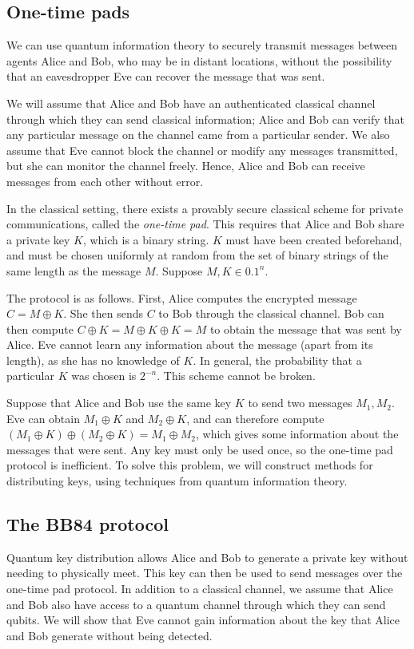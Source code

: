 \subsection{One-time pads}
We can use quantum information theory to securely transmit messages between agents Alice and Bob, who may be in distant locations, without the possibility that an eavesdropper Eve can recover the message that was sent.

We will assume that Alice and Bob have an authenticated classical channel through which they can send classical information; Alice and Bob can verify that any particular message on the channel came from a particular sender.
We also assume that Eve cannot block the channel or modify any messages transmitted, but she can monitor the channel freely.
Hence, Alice and Bob can receive messages from each other without error.

In the classical setting, there exists a provably secure classical scheme for private communications, called the \emph{one-time pad}.
This requires that Alice and Bob share a private key \( K \), which is a binary string.
\( K \) must have been created beforehand, and must be chosen uniformly at random from the set of binary strings of the same length as the message \( M \).
Suppose \( M, K \in \qty{0,1}^n \).

The protocol is as follows.
First, Alice computes the encrypted message \( C = M \oplus K \).
She then sends \( C \) to Bob through the classical channel.
Bob can then compute \( C \oplus K = M \oplus K \oplus K = M \) to obtain the message that was sent by Alice.
Eve cannot learn any information about the message (apart from its length), as she has no knowledge of \( K \).
In general, the probability that a particular \( K \) was chosen is \( 2^{-n} \).
This scheme cannot be broken.

Suppose that Alice and Bob use the same key \( K \) to send two messages \( M_1, M_2 \).
Eve can obtain \( M_1 \oplus K \) and \( M_2 \oplus K \), and can therefore compute \( (M_1 \oplus K) \oplus (M_2 \oplus K) = M_1 \oplus M_2 \), which gives some information about the messages that were sent.
Any key must only be used once, so the one-time pad protocol is inefficient.
To solve this problem, we will construct methods for distributing keys, using techniques from quantum information theory.

\subsection{The BB84 protocol}
Quantum key distribution allows Alice and Bob to generate a private key without needing to physically meet.
This key can then be used to send messages over the one-time pad protocol.
In addition to a classical channel, we assume that Alice and Bob also have access to a quantum channel through which they can send qubits.
We will show that Eve cannot gain information about the key that Alice and Bob generate without being detected.

